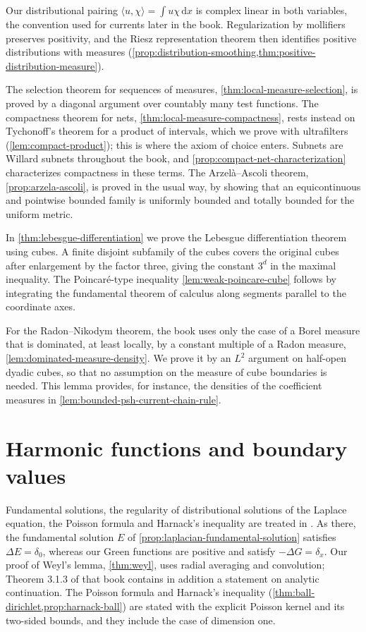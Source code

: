 Our distributional pairing $\langle u,\chi\rangle=\int u\chi\,\mathrm d x$ is complex linear in both variables, the convention used for currents later in the book. Regularization by mollifiers preserves positivity, and the Riesz representation theorem then identifies positive distributions with measures (\cref{prop:distribution-smoothing,thm:positive-distribution-measure}).

The selection theorem for sequences of measures, \cref{thm:local-measure-selection}, is proved by a diagonal argument over countably many test functions. The compactness theorem for nets, \cref{thm:local-measure-compactness}, rests instead on Tychonoff's theorem for a product of intervals, which we prove with ultrafilters (\cref{lem:compact-product}); this is where the axiom of choice enters. Subnets are Willard subnets throughout the book, and \cref{prop:compact-net-characterization} characterizes compactness in these terms. The Arzel\`a--Ascoli theorem, \cref{prop:arzela-ascoli}, is proved in the usual way, by showing that an equicontinuous and pointwise bounded family is uniformly bounded and totally bounded for the uniform metric.

In \cref{thm:lebesgue-differentiation} we prove the Lebesgue differentiation theorem using cubes. A finite disjoint subfamily of the cubes covers the original cubes after enlargement by the factor three, giving the constant $3^d$ in the maximal inequality. The Poincar\'e-type inequality \cref{lem:weak-poincare-cube} follows by integrating the fundamental theorem of calculus along segments parallel to the coordinate axes.

For the Radon--Nikodym theorem, the book uses only the case of a Borel measure that is dominated, at least locally, by a constant multiple of a Radon measure, \cref{lem:dominated-measure-density}. We prove it by an $L^2$ argument on half-open dyadic cubes, so that no assumption on the measure of cube boundaries is needed. This lemma provides, for instance, the densities of the coefficient measures in \cref{lem:bounded-psh-current-chain-rule}.

\section{Harmonic functions and boundary values}
\label{sec:history-harmonic}
Fundamental solutions, the regularity of distributional solutions of the Laplace equation, the Poisson formula and Harnack's inequality are treated in \cite[Theorems 3.1.2--3.1.7]{Hor07}. As there, the fundamental solution $E$ of \cref{prop:laplacian-fundamental-solution} satisfies $\Delta E=\delta_0$, whereas our Green functions are positive and satisfy $-\Delta G=\delta_x$. Our proof of Weyl's lemma, \cref{thm:weyl}, uses radial averaging and convolution; Theorem 3.1.3 of that book contains in addition a statement on analytic continuation. The Poisson formula and Harnack's inequality (\cref{thm:ball-dirichlet,prop:harnack-ball}) are stated with the explicit Poisson kernel and its two-sided bounds, and they include the case of dimension one.

